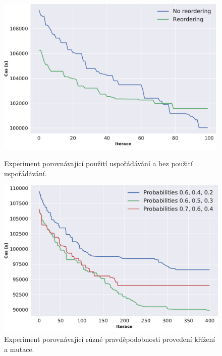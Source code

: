 \begin{figure}[t]
    \begin{minipage}{0.49\textwidth}
        \centering
        \includegraphics[width=0.99\textwidth]{figures/vyhodnoceni/plotComparisonReordering.pdf}
        \caption{Experiment porovnávající použití uspořádávání a bez použití uspořádávání.}
        \label{fig:compReordering}
    \end{minipage}\hfill
    \begin{minipage}{0.49\textwidth}
        \centering
        \includegraphics[width=1\textwidth]{figures/vyhodnoceni/plotComparisonParams.pdf}
        \caption{Experiment porovnávající různé pravděpodobnosti provedení křížení a mutace.}
        \label{fig:compParams}
    \end{minipage}\hfill
\end{figure}

